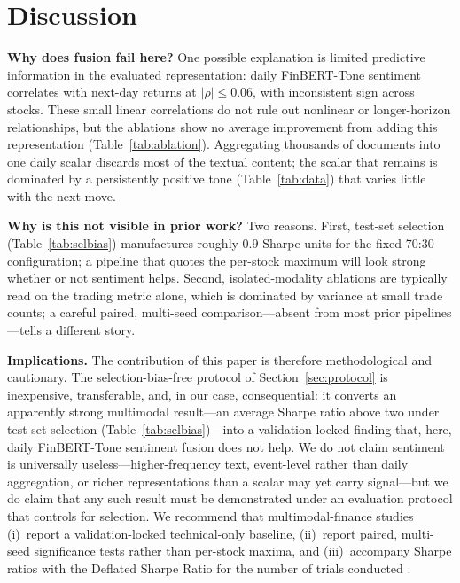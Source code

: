 \documentclass[conference]{IEEEtran}
\begin{document}
\section{Discussion}

\noindent\textbf{Why does fusion fail here?}
One possible explanation is limited predictive information in the evaluated
representation: daily FinBERT-Tone sentiment correlates with next-day returns
at $|\rho|\le0.06$, with inconsistent sign across stocks. These small linear
correlations do not rule out nonlinear or longer-horizon relationships, but
the ablations show no average improvement from adding this representation
(Table~\ref{tab:ablation}).
Aggregating thousands of documents into one daily scalar discards most of the
textual content; the scalar that remains is dominated by a persistently
positive tone (Table~\ref{tab:data}) that varies little with the next move.

\noindent\textbf{Why is this not visible in prior work?}
Two reasons. First, test-set selection (Table~\ref{tab:selbias}) manufactures
roughly $0.9$ Sharpe units for the fixed-70:30 configuration; a pipeline that quotes the
per-stock maximum will look strong whether or not sentiment helps. Second,
isolated-modality ablations are typically read on the trading metric alone,
which is dominated by variance at small trade counts; a careful paired,
multi-seed comparison---absent from most prior pipelines---tells a different
story.

\noindent\textbf{Implications.}
The contribution of this paper is therefore methodological and cautionary. The
selection-bias-free protocol of Section~\ref{sec:protocol} is inexpensive,
transferable, and, in our case, consequential: it converts an apparently strong
multimodal result---an average Sharpe ratio above two under test-set
selection (Table~\ref{tab:selbias})---into a validation-locked finding that,
here, daily FinBERT-Tone sentiment fusion does not help. We do not claim sentiment is universally
useless---higher-frequency text, event-level rather than daily aggregation, or
richer representations than a scalar may yet carry signal---but we do claim
that any such result must be demonstrated under an evaluation protocol that
controls for selection. We recommend that multimodal-finance studies (i)~report
a validation-locked technical-only baseline, (ii)~report paired, multi-seed
significance tests rather than per-stock maxima, and (iii)~accompany Sharpe
ratios with the Deflated Sharpe Ratio for the number of trials conducted
\cite{bailey2014dsr,bailey2016pbo}.
\end{document}
